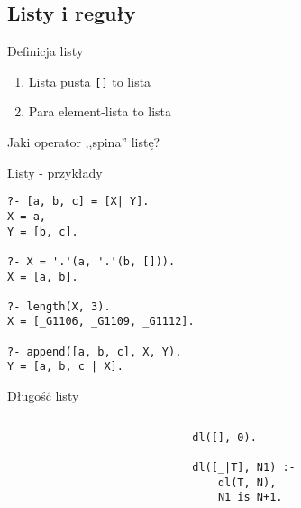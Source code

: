 \documentclass[blue]{beamer}
\begin{document}
\subsection{Listy i reguły}
\begin{frame}[fragile]{Definicja listy}
\begin{enumerate}
\item Lista pusta \verb+[]+ to lista
\item Para element-lista to lista
\end{enumerate}

Jaki operator ,,spina'' listę?


\end{frame}
\begin{frame}[fragile]{Listy - przykłady}
\begin{lstlisting}
?- [a, b, c] = [X| Y].
X = a,
Y = [b, c].

?- X = '.'(a, '.'(b, [])).
X = [a, b].

?- length(X, 3).
X = [_G1106, _G1109, _G1112].

?- append([a, b, c], X, Y).
Y = [a, b, c | X].
\end{lstlisting}
\end{frame}
\begin{frame}[fragile]{Długość listy}
\begin{columns}
\begin{column}{.5\linewidth}
\end{column}
\begin{column}{.5\linewidth}
\begin{lstlisting}
dl([], 0).

dl([_|T], N1) :-
    dl(T, N),
    N1 is N+1.
\end{lstlisting}
\end{column}
\end{columns}
\end{frame}
\end{document}
